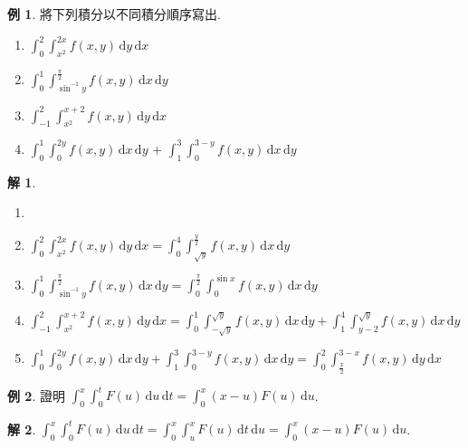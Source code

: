 \documentclass[12pt]{extarticle}
\newcommand{\ds}{\displaystyle}
\theoremstyle{definition}
\newtheorem*{ex}{例}
\newtheorem*{sol}{解}
\begin{document}
\begin{ex} 將下列積分以不同積分順序寫出. 
  \begin{multicols}{2}
    \begin{enumerate}\setlength{\itemsep}{0pt}
      \item $\ds\int_0^2\!\int_{x^2}^{2x}\!f(x, y)\,\text{d}y\,\text{d}x$
      \item $\ds\int_0^1\!\int_{\sin^{-1}y}^{\frac{\pi}{2}}\!f(x, y)\,\text{d}x\,\text{d}y$
      \item $\ds\int_{-1}^2\!\int_{x^2}^{x + 2}\!f(x, y)\,\text{d}y\,\text{d}x$
      \item $\ds\int_0^1\!\int_0^{2y}\!f(x, y)\,\text{d}x\,\text{d}y$ + $\ds\int_1^3\!\int_0^{3 - y}\!f(x, y)\,\text{d}x\,\text{d}y$
    \end{enumerate}
  \end{multicols}
\end{ex}

\begin{sol}
  \begin{enumerate}\setlength{\itemsep}{0pt}
    \item[]
    \item $\ds\int_0^2\!\int_{x^2}^{2x}\!f(x, y)\,\text{d}y\,\text{d}x = \int_0^4\!\int_{\sqrt{y}}^{\frac{y}{2}}\!f(x, y)\,\text{d}x\,\text{d}y$
    \item $\ds\int_0^1\!\int_{\sin^{-1}y}^{\frac{\pi}{2}}\!f(x, y)\,\text{d}x\,\text{d}y = \int_0^{\frac{\pi}{2}}\!\int_0^{\sin x}\!f(x, y)\,\text{d}x\,\text{d}y$
    \item $\ds\int_{-1}^2\!\int_{x^2}^{x + 2}\!f(x, y)\,\text{d}y\,\text{d}x = \int_0^1\!\int_{-\sqrt{y}}^{\sqrt{y}}\!f(x, y)\,\text{d}x\,\text{d}y + \int_1^4\!\int_{y - 2}^{\sqrt{y}}\!f(x, y)\,\text{d}x\,\text{d}y$
    \item $\ds\int_0^1\!\int_0^{2y}\!f(x, y)\,\text{d}x\,\text{d}y + \int_1^3\!\int_0^{3 - y}\!f(x, y)\,\text{d}x\,\text{d}y = \int_0^2\!\int_{\frac{x}{2}}^{3 - x}\!f(x, y)\,\text{d}y\,\text{d}x$
  \end{enumerate}
\end{sol}

\begin{ex}
  證明 $\ds\int_0^x\!\int_0^t F(u)\,\text{d}u\,\text{d}t = \int_0^x(x - u)F(u)\,\text{d}u$.
\end{ex}

\begin{sol}
  $\ds\int_0^x\!\int_0^t F(u)\,\text{d}u\,\text{d}t = \int_0^x\!\int_u^x F(u)\,\text{d}t\,\text{d}u = \int_0^x(x - u)F(u)\,\text{d}u$.
\end{sol}
\end{document}
